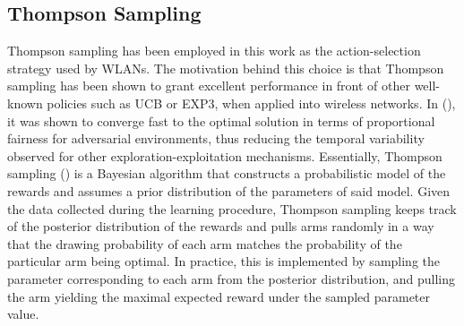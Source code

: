 \documentclass{article}
\begin{document}
\subsection{Thompson Sampling}
\label{subsection:thompson_sampling}
Thompson sampling has been employed in this work as the action-selection strategy used by WLANs. The motivation behind this choice is that Thompson sampling has been shown to grant excellent performance in front of other well-known policies such as UCB or EXP3, when applied into wireless networks. In (\citealp{wilhelmi2017collaborative}), it was shown to converge fast to the optimal solution in terms of proportional fairness for adversarial environments, thus reducing the temporal variability observed for other exploration-exploitation mechanisms. Essentially, Thompson sampling (\citealp{thompson1933likelihood}) is a Bayesian algorithm that constructs a probabilistic model of the rewards and assumes a prior distribution of the parameters of said model. Given the data collected during the learning procedure, Thompson sampling keeps track of the posterior distribution of the rewards and pulls arms randomly in a way that the drawing probability of each arm matches the probability of the particular arm being optimal. In practice, this is implemented by sampling the parameter corresponding to each arm from the posterior distribution, and pulling the arm yielding the maximal expected reward under the sampled parameter value. 
\end{document}

